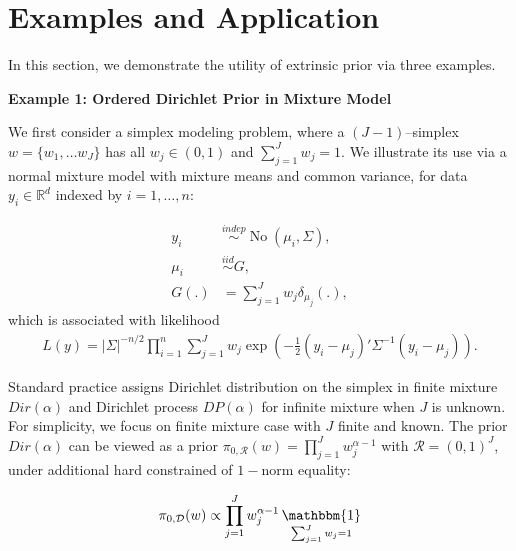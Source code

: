 \documentclass[10pt]{article}
\newcommand{\bb}[1]{\mathbb{#1}}
\newcommand{\mc}[1]{\mathcal{#1}}
\DeclareMathOperator{\No}{No}
\DeclareMathOperator{\1}{\mathbbm{1}}
\begin{document}
\section{Examples and Application}

In this section, we demonstrate the utility of extrinsic prior via three examples. %

{\bf Example 1: Ordered Dirichlet Prior in Mixture Model}

We first consider a simplex modeling problem, where a $(J-1)$--simplex $w=\{w_1,\ldots w_J\}$ has all $w_j\in (0,1)$ and $\sum_{j=1}^J w_j=1$. We illustrate its use via a normal mixture model with mixture means and common variance, for data $y_i\in \bb R^d$ indexed by $i=1,\ldots,n$:

\begin{equation*}
\begin{aligned}
y_i &\stackrel{indep}{\sim} \No(\mu_i,\Sigma),\\
\mu_i &\stackrel{iid}{\sim} G,\\
G(.) & = \sum_{j=1}^{J} w_j \delta_{\mu_j}(.),
\end{aligned}
\end{equation*}
which is associated with likelihood
\begin{equation*}
\begin{aligned}
L(y) = |\Sigma|^{-n/2}\prod_{i=1}^n \sum_{j=1}^{J} w_j \exp\left(-\frac{1}{2}{ (y_i-\mu_j)'\Sigma^{-1}(y_i-\mu_j)}\right).
\end{aligned}
\end{equation*}

Standard practice assigns Dirichlet distribution on the simplex in finite mixture $Dir(\alpha)$ and Dirichlet process $DP(\alpha)$ for infinite mixture when $J$ is unknown. For simplicity, we focus on finite mixture case with $J$ finite and known. The prior $Dir(\alpha)$ can be viewed as a prior $\pi_{0, \mc R}(w) = \prod_{j=1}^J w_j^{\alpha-1}$ with $\mc R = (0,1)^J$, under additional hard constrained of $1-$norm equality:

\begin{equation}
\begin{aligned}
\label{canonical_dp_prior}
\pi_{0, \mc D}(w) \propto \prod_{j=1}^J w_j^{\alpha-1} \1_{\sum_{j=1}^J w_j=1}
\end{aligned}
\end{equation}
\end{document}
